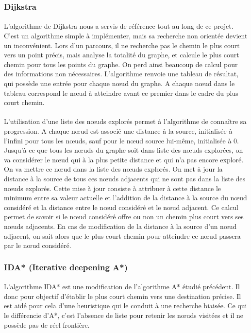 \documentclass[pidr]{tnreport}
\begin{document}
		\subsubsection{Dijkstra}			
\paragraph{}
L'algorithme de Dijkstra nous a servis de référence tout au long de ce projet. C'est un algorithme simple à implémenter, mais sa recherche non orientée devient un inconvénient. Lors d'un parcours, il ne recherche pas le chemin le plus court vers un point précis, mais analyse la totalité du graphe, et calcule le plus court chemin pour tous les points du graphe. On perd ainsi beaucoup de calcul pour des informations non nécessaires. L’algorithme renvoie une tableau de résultat, qui possède une entrée pour chaque nœud du graphe. A chaque nœud dans le tableau correspond le nœud à atteindre avant ce premier dans le cadre du plus court chemin.

\paragraph{}
L'utilisation d'une liste des nœuds explorés permet à l'algorithme de connaître sa progression. A chaque nœud est associé une distance à la source, initialisée à l'infini pour tous les nœuds, sauf pour le nœud source lui-même, initialisée à 0. Jusqu'à ce que tous les nœuds du graphe soit dans liste des nœuds explorées, on va considérer le nœud qui à la plus petite distance et qui n'a pas encore exploré. On va mettre ce nœud dans la liste des nœuds explorés. On met à jour la distance à la source de tous ces nœuds adjacents qui ne sont pas dans la liste des nœuds explorés. Cette mise à jour consiste à attribuer à cette distance le minimum entre sa valeur actuelle et l'addition de la distance à la source du nœud considéré et la distance entre le nœud considéré et le nœud adjacent. Ce calcul permet de savoir si le nœud considéré offre ou non un chemin plus court vers ses nœuds adjacents. En cas de modification de la distance à la source d'un nœud adjacent, on sait alors que le plus court chemin pour atteindre ce nœud passera par le nœud considéré.   


			\subsubsection{IDA* (Iterative deepening A*)}
\paragraph{}
L'algorithme IDA* est une modification de l'algorithme A* étudié précédent. Il donc pour objectif d'établir le plus court chemin vers une destination précise. Il est aidé pour cela d'une heuristique qui le conduit à une recherche biaisée. Ce qui le différencie d'A*, c'est l'absence de liste pour retenir les nœuds visitées et il ne possède pas de réel frontière. 
\end{document}
